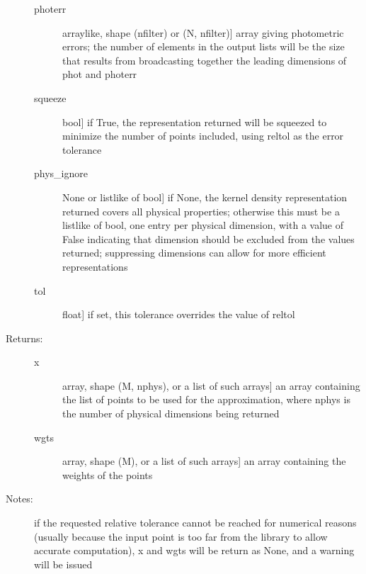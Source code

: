 \documentclass[letterpaper,10pt,english]{sphinxmanual}
\begin{document}
\begin{fulllineitems}
\begin{fulllineitems}
\begin{description}
\begin{description}
\item[{photerr}] \leavevmode{[}arraylike, shape (nfilter) or (N, nfilter){]}
array giving photometric errors; the number of elements
in the output lists will be the size that results from
broadcasting together the leading dimensions of phot and
photerr

\item[{squeeze}] \leavevmode{[}bool{]}
if True, the representation returned will be squeezed to
minimize the number of points included, using reltol as
the error tolerance

\item[{phys\_ignore}] \leavevmode{[}None or listlike of bool{]}
if None, the kernel density representation returned
covers all physical properties; otherwise this must be a
listlike of bool, one entry per physical dimension, with
a value of False indicating that dimension should be
excluded from the values returned; suppressing
dimensions can allow for more efficient representations

\item[{tol}] \leavevmode{[}float{]}
if set, this tolerance overrides the value of reltol

\end{description}

\item[{Returns:}] \leavevmode\begin{description}
\item[{x}] \leavevmode{[}array, shape (M, nphys), or a list of such arrays{]}
an array containing the list of points to be used for
the approximation, where nphys is the number of
physical dimensions being returned

\item[{wgts}] \leavevmode{[}array, shape (M), or a list of such arrays{]}
an array containing the weights of the points

\end{description}

\item[{Notes:}] \leavevmode
if the requested relative tolerance cannot be reached for
numerical reasons (usually because the input point is too
far from the library to allow accurate computation), x and
wgts will be return as None, and a warning will be issued

\end{description}

\end{fulllineitems}



\end{fulllineitems}
\end{document}
